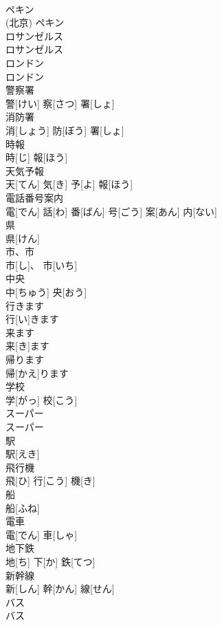 \documentclass[8pt]{extreport}
\begin{document}
\begin{CJK}{UTF8}{min}
\\	ペキン	
\\	(北京)	ペキン		
\\	ロサンゼルス	
\\	ロサンゼルス		
\\	ロンドン	
\\	ロンドン		
\\	警察署	
\\	警[けい] 察[さつ] 署[しょ]		
\\	消防署	
\\	消[しょう] 防[ぼう] 署[しょ]		
\\	時報	
\\	時[じ] 報[ほう]		
\\	天気予報	
\\	天[てん] 気[き] 予[よ] 報[ほう]		
\\	電話番号案内	
\\	電[でん] 話[わ] 番[ばん] 号[ごう] 案[あん] 内[ない]		
\\	県	
\\	県[けん]		
\\	市、市	
\\	市[し]、 市[いち]		
\\	中央	
\\	中[ちゅう] 央[おう]		
\\	行きます	
\\	行[い]きます		
\\	来ます	
\\	来[き]ます		
\\	帰ります	
\\	帰[かえ]ります		
\\	学校	
\\	学[がっ] 校[こう]		
\\	スーパー	
\\	スーパー		
\\	駅	
\\	駅[えき]		
\\	飛行機	
\\	飛[ひ] 行[こう] 機[き]		
\\	船	
\\	船[ふね]		
\\	電車	
\\	電[でん] 車[しゃ]		
\\	地下鉄	
\\	地[ち] 下[か] 鉄[てつ]		
\\	新幹線	
\\	新[しん] 幹[かん] 線[せん]		
\\	バス	
\\	バス		

\end{CJK}
\end{document}
